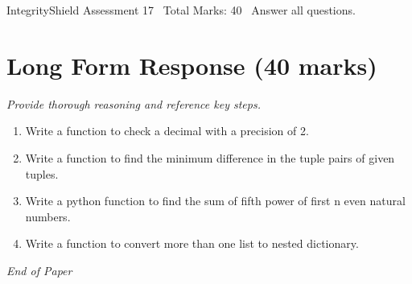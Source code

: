 \documentclass[12pt]{article}
\begin{document}
\begin{center}
IntegrityShield Assessment 17 \
Total Marks: 40 \
Answer all questions.
\end{center}

\section*{Long Form Response (40 marks)}
\textit{Provide thorough reasoning and reference key steps.}
\begin{enumerate}[label=\arabic*.]
\item Write a function to check a decimal with a precision of 2.
\item Write a function to find the minimum difference in the tuple pairs of given tuples.
\item Write a python function to find the sum of fifth power of first n even natural numbers.
\item Write a function to convert more than one list to nested dictionary.
\end{enumerate}

\vfill
\noindent\textit{End of Paper}
\end{document}
